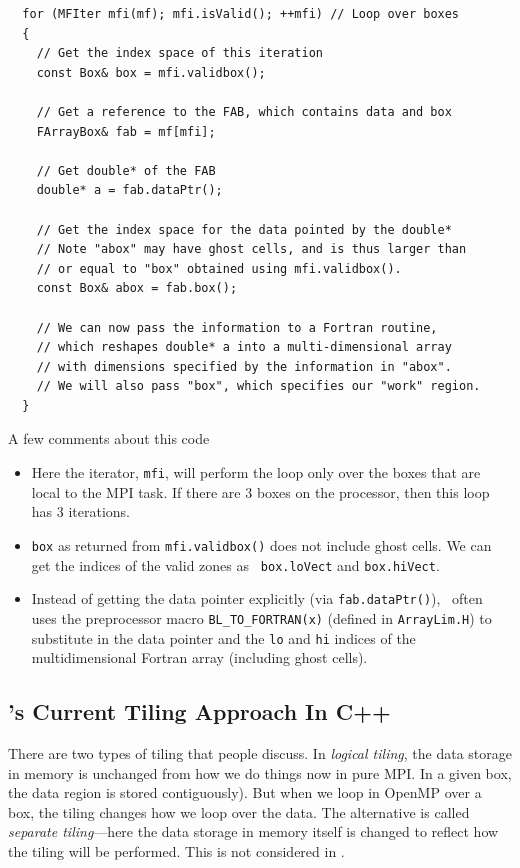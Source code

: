 \begin{lstlisting}
  for (MFIter mfi(mf); mfi.isValid(); ++mfi) // Loop over boxes
  {
    // Get the index space of this iteration
    const Box& box = mfi.validbox(); 

    // Get a reference to the FAB, which contains data and box  
    FArrayBox& fab = mf[mfi];  

    // Get double* of the FAB 
    double* a = fab.dataPtr();

    // Get the index space for the data pointed by the double* 
    // Note "abox" may have ghost cells, and is thus larger than 
    // or equal to "box" obtained using mfi.validbox().
    const Box& abox = fab.box();

    // We can now pass the information to a Fortran routine,
    // which reshapes double* a into a multi-dimensional array 
    // with dimensions specified by the information in "abox".
    // We will also pass "box", which specifies our "work" region.
  }
\end{lstlisting}
A few comments about this code
\begin{itemize}
\item Here the iterator, {\tt mfi}, will perform the loop only over the
   boxes that are local to the MPI task.  If there are 3 boxes on the
   processor, then this loop has 3 iterations.
      
\item {\tt box} as returned from {\tt mfi.validbox()} does not include
   ghost cells.  We can get the indices of the valid zones as {\tt
   box.loVect} and {\tt box.hiVect}.

\item Instead of getting the data pointer explicitly (via {\tt fab.dataPtr()}),
   \castro\ often uses the preprocessor macro {\tt BL\_TO\_FORTRAN(x)} (defined
   in {\tt ArrayLim.H}) to substitute in the data pointer and the {\tt lo}
   and {\tt hi} indices of the multidimensional Fortran array (including ghost cells).
\end{itemize}


\subsection{\boxlib's Current Tiling Approach In C++}
\label{sec:boxlib1}

There are two types of tiling that people discuss.  In {\em logical
tiling}, the data storage in memory is unchanged from how we do things
now in pure MPI.  In a given box, the data region is stored
contiguously).  But when we loop in OpenMP over a box, the tiling
changes how we loop over the data.  The alternative is called {\em
separate tiling}---here the data storage in memory itself is changed
to reflect how the tiling will be performed.  This is not considered
in \boxlib.

